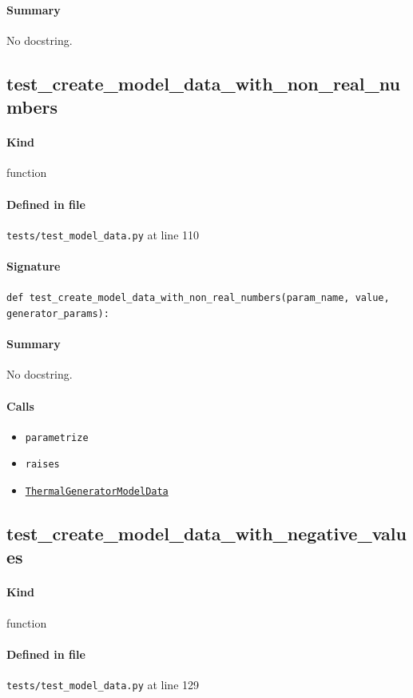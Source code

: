 \documentclass[11pt]{report}
\begin{document}
\paragraph{Summary} No docstring.
\subsection{test\_create\_model\_data\_with\_non\_real\_numbers}
\label{def:tests-test_model_data.py:test_create_model_data_with_non_real_numbers:L110}
\paragraph{Kind} function
\paragraph{Defined in file} \texttt{tests/test\_model\_data.py} at line 110
\paragraph{Signature} \texttt{def test\_create\_model\_data\_with\_non\_real\_numbers(param\_name, value, generator\_params):}
\paragraph{Summary} No docstring.
\paragraph{Calls}
\begin{itemize}[leftmargin=*]
  \item \texttt{parametrize}
  \item \texttt{raises}
  \item \hyperref[def:model_data.py:ThermalGeneratorModelData:L185]{\texttt{ThermalGeneratorModelData}}
\end{itemize}
\subsection{test\_create\_model\_data\_with\_negative\_values}
\label{def:tests-test_model_data.py:test_create_model_data_with_negative_values:L129}
\paragraph{Kind} function
\paragraph{Defined in file} \texttt{tests/test\_model\_data.py} at line 129
\end{document}
